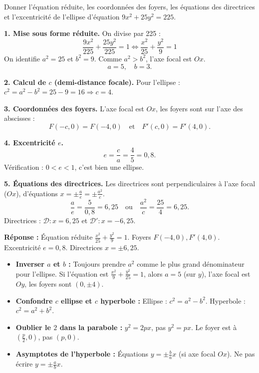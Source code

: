 \documentclass[11pt]{article}
\begin{document}
\begin{exoresolu}
{Donner l'équation réduite, les coordonnées des foyers, les équations des directrices et l'excentricité de l'ellipse d'équation $9x^2 + 25y^2 = 225$.}

\tcblower
\textbf{1. Mise sous forme réduite.}
On divise par 225 :
\[
\frac{9x^2}{225} + \frac{25y^2}{225} = 1 \iff \frac{x^2}{25} + \frac{y^2}{9} = 1
\]
On identifie $a^2 = 25$ et $b^2 = 9$. Comme $a^2 > b^2$, l'axe focal est $Ox$.
\[
a = 5, \quad b = 3.
\]

\textbf{2. Calcul de $c$ (demi-distance focale).}
Pour l'ellipse : $c^2 = a^2 - b^2 = 25 - 9 = 16 \Rightarrow c = 4$.

\textbf{3. Coordonnées des foyers.}
L'axe focal est $Ox$, les foyers sont sur l'axe des abscisses :
\[
F(-c, 0) = F(-4, 0) \quad \text{et} \quad F'(c, 0) = F'(4, 0).
\]

\textbf{4. Excentricité $e$.}
\[
e = \frac{c}{a} = \frac{4}{5} = 0,8.
\]
Vérification : $0 < e < 1$, c'est bien une ellipse.

\textbf{5. Équations des directrices.}
Les directrices sont perpendiculaires à l'axe focal ($Ox$), d'équations $x = \pm \frac{a}{e} = \pm \frac{a^2}{c}$.
\[
\frac{a}{e} = \frac{5}{0,8} = 6,25 \quad \text{ou} \quad \frac{a^2}{c} = \frac{25}{4} = 6,25.
\]
Directrices : $\mathcal{D} : x = 6,25$ et $\mathcal{D}' : x = -6,25$.

\textbf{Réponse :} Équation réduite $\frac{x^2}{25}+\frac{y^2}{9}=1$. Foyers $F(-4,0), F'(4,0)$. Excentricité $e=0,8$. Directrices $x=\pm 6,25$.
\end{exoresolu}

\begin{attention}
\begin{itemize}
    \item \textbf{Inverser $a$ et $b$ :} Toujours prendre $a^2$ comme le plus grand dénominateur pour l'ellipse. Si l'équation est $\frac{x^2}{9}+\frac{y^2}{25}=1$, alors $a=5$ (sur $y$), l'axe focal est $Oy$, les foyers sont $(0, \pm 4)$.
    \item \textbf{Confondre $c$ ellipse et $c$ hyperbole :} Ellipse : $c^2 = a^2 - b^2$. Hyperbole : $c^2 = a^2 + b^2$.
    \item \textbf{Oublier le $2$ dans la parabole :} $y^2 = 2px$, pas $y^2 = px$. Le foyer est à $(\frac{p}{2}, 0)$, pas $(p, 0)$.
    \item \textbf{Asymptotes de l'hyperbole :} Équations $y = \pm \frac{b}{a}x$ (si axe focal $Ox$). Ne pas écrire $y = \pm \frac{a}{b}x$.
\end{itemize}
\end{attention}
\end{document}
